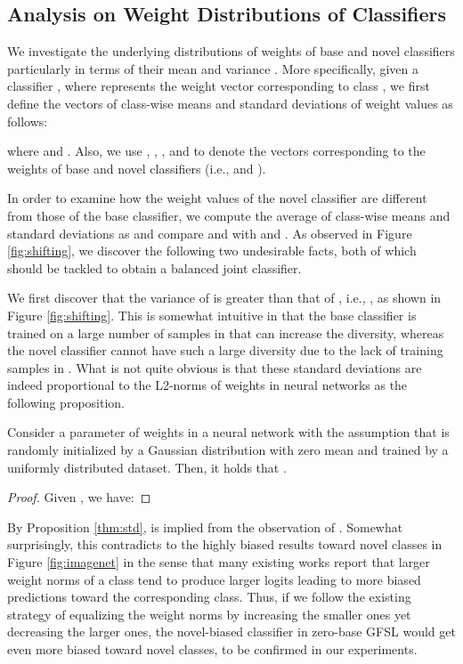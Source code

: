 \subsection{Analysis on Weight Distributions of Classifiers} 

We investigate the underlying distributions of weights of base and novel classifiers particularly in terms of their mean  and variance . More specifically, given a classifier , where  represents the weight vector corresponding to class , we first define the vectors of class-wise means and standard deviations of weight values as follows:

where  and . Also, we use , , , and  to denote the vectors corresponding to the weights of base and novel classifiers (i.e.,  and ). 

In order to examine how the weight values of the novel classifier are different from those of the base classifier, we compute the average of class-wise means and standard deviations as  and compare  and  with  and . As observed in Figure \ref{fig:shifting}, we discover the following two undesirable facts, both of which should be tackled to obtain a balanced joint classifier.






We first discover that the variance of  is greater than that of , i.e., , as shown in Figure \ref{fig:shifting}. This is somewhat intuitive in that the base classifier is trained on a large number of samples in  that can increase the diversity, whereas the novel classifier cannot have such a large diversity due to the lack of training samples in . What is not quite obvious is that these standard deviations are indeed proportional to the L2-norms of weights in neural networks as the following proposition.
\begin{proposition} \label{thm:std}
Consider a parameter  of  weights in a neural network with the assumption that  is randomly initialized by a Gaussian distribution with zero mean and trained by a uniformly distributed dataset. Then, it holds that .
\end{proposition}
\begin{proof}
Given , we have: 
\end{proof}
By Proposition \ref{thm:std},  is implied from the observation of . Somewhat surprisingly, this contradicts to the highly biased results toward novel classes in Figure \ref{fig:imagenet} in the sense that many existing works \cite{HouPLWL19,KangXRYGFK20,ZhaoXGZX20} report that larger weight norms of a class tend to produce larger logits leading to more biased predictions toward the corresponding class. Thus, if we follow the existing strategy of equalizing the weight norms \cite{HouPLWL19,KangXRYGFK20,ZhaoXGZX20} by increasing the smaller ones yet decreasing the larger ones, the novel-biased classifier in zero-base GFSL would get even more biased toward novel classes, to be confirmed in our experiments.

